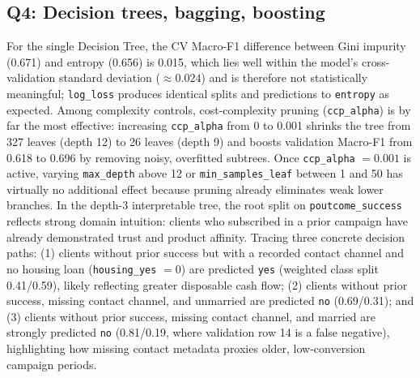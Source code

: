 \subsection{Q4: Decision trees, bagging, boosting}

For the single Decision Tree, the CV Macro-F1 difference between Gini impurity (0.671) and entropy (0.656) is 0.015, which lies well within the model's cross-validation standard deviation ($\approx 0.024$) and is therefore not statistically meaningful; \texttt{log\_loss} produces identical splits and predictions to \texttt{entropy} as expected. Among complexity controls, cost-complexity pruning (\texttt{ccp\_alpha}) is by far the most effective: increasing \texttt{ccp\_alpha} from 0 to 0.001 shrinks the tree from 327 leaves (depth 12) to 26 leaves (depth 9) and boosts validation Macro-F1 from 0.618 to 0.696 by removing noisy, overfitted subtrees. Once \texttt{ccp\_alpha} $= 0.001$ is active, varying \texttt{max\_depth} above 12 or \texttt{min\_samples\_leaf} between 1 and 50 has virtually no additional effect because pruning already eliminates weak lower branches. In the depth-3 interpretable tree, the root split on \texttt{poutcome\_success} reflects strong domain intuition: clients who subscribed in a prior campaign have already demonstrated trust and product affinity. Tracing three concrete decision paths: (1) clients without prior success but with a recorded contact channel and no housing loan (\texttt{housing\_yes} $= 0$) are predicted \texttt{yes} (weighted class split 0.41/0.59), likely reflecting greater disposable cash flow; (2) clients without prior success, missing contact channel, and unmarried are predicted \texttt{no} (0.69/0.31); and (3) clients without prior success, missing contact channel, and married are strongly predicted \texttt{no} (0.81/0.19, where validation row 14 is a false negative), highlighting how missing contact metadata proxies older, low-conversion campaign periods.


